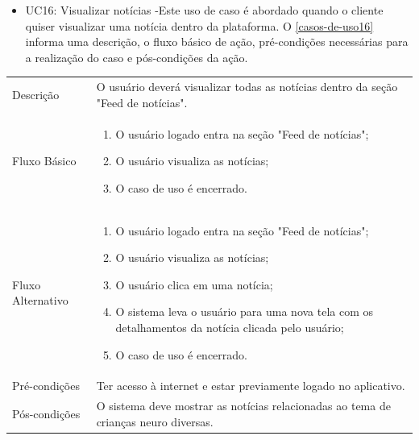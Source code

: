 
\begin{itemize}
	\item UC16: Visualizar notícias -Este uso de caso é abordado quando o cliente quiser visualizar uma notícia dentro da plataforma. O \autoref{casos-de-uso16} informa uma descrição, o fluxo básico de ação, pré-condições necessárias para a realização do caso e pós-condições da ação.\\
\end{itemize}


\begin{quadro}[htb]
	\centering
	\ABNTEXfontereduzida
	\caption[Caso de Uso Visualizar notícias]{Caso de Uso Visualizar notícias}
	\label{casos-de-uso16}
\end{quadro}
\begin{longtable}{|p{3.3cm}|p{12.3cm}|}
	\hline
	\thead{} & \thead{Ator} \\
	\hline
	Descrição & O usuário deverá visualizar todas as notícias dentro da seção "Feed de notícias".\\
	\hline
	Fluxo Básico  & 
	\begin{enumerate}
		\item O usuário logado entra na seção "Feed de notícias";
		\item O usuário visualiza as notícias;
		\item O caso de uso é encerrado. 
	\end{enumerate}\\
	\hline
	Fluxo Alternativo &
	\begin{enumerate}
		\item O usuário logado entra na seção "Feed de notícias";
		\item O usuário visualiza as notícias;
		\item O usuário clica em uma notícia;
		\item O sistema leva o usuário para uma nova tela com os detalhamentos da notícia clicada pelo usuário;
		\item O caso de uso é encerrado. 
	\end{enumerate}\\
	\hline
	Pré-condições & Ter acesso à internet e estar previamente logado no aplicativo.\\
	\hline
	Pós-condições & O sistema deve mostrar as notícias relacionadas ao tema de crianças neuro diversas.\\
	\hline
\end{longtable}
	
